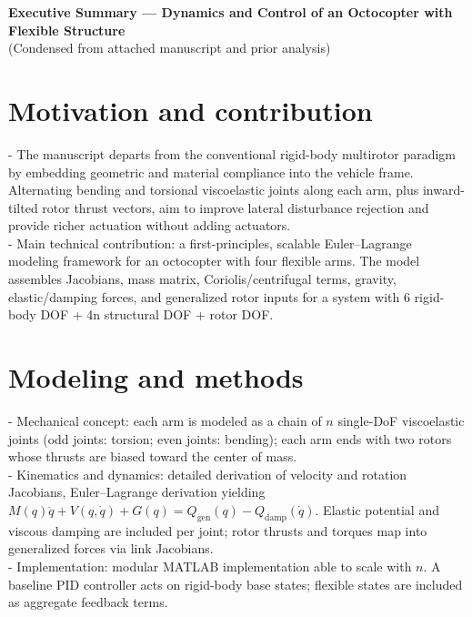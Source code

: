 \documentclass[11pt,letterpaper]{article}
\begin{document}
\begin{center}
  {\Large\bfseries Executive Summary — Dynamics and Control of an Octocopter with Flexible Structure}\\[6pt]
  {\small (Condensed from attached manuscript and prior analysis)}
\end{center}

\vspace{6pt}

\section*{Motivation and contribution}
- The manuscript departs from the conventional rigid-body multirotor
paradigm by embedding geometric and material compliance into the
vehicle frame. Alternating bending and torsional viscoelastic joints
along each arm, plus inward-tilted rotor thrust vectors, aim to
improve lateral disturbance rejection and provide richer actuation
without adding actuators.
\\
- Main technical contribution: a first-principles, scalable
Euler--Lagrange modeling framework for an octocopter with four
flexible arms. The model assembles Jacobians, mass matrix,
Coriolis/centrifugal terms, gravity, elastic/damping forces, and
generalized rotor inputs for a system with 6 rigid-body DOF + 4n
structural DOF + rotor DOF.

\section*{Modeling and methods}
- Mechanical concept: each arm is modeled as a chain of $n$ single-DoF
viscoelastic joints (odd joints: torsion; even joints: bending); each
arm ends with two rotors whose thrusts are biased toward the center of
mass.
\\
- Kinematics and dynamics: detailed derivation of velocity and
rotation Jacobians, Euler--Lagrange derivation yielding
$M(q)\ddot q + V(q,\dot q) + G(q) = Q_{\mathrm{gen}}(q) -
Q_{\mathrm{damp}}(\dot q)$.  Elastic potential and viscous damping are
included per joint; rotor thrusts and torques map into generalized
forces via link Jacobians.
\\
- Implementation: modular MATLAB implementation able to scale with
$n$. A baseline PID controller acts on rigid-body base states;
flexible states are included as aggregate feedback terms.
\end{document}
